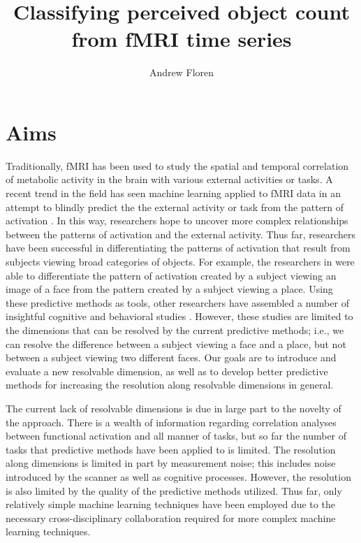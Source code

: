 \documentclass[12pt]{article}
\title{Classifying perceived object count from fMRI time series}
\author{Andrew Floren}
\date{}
\begin{document}
\maketitle{}

\section{Aims}
Traditionally, fMRI has been used to study the spatial and temporal correlation of metabolic activity in the brain with various external activities or tasks.
A recent trend in the field has seen machine learning applied to fMRI data in an attempt to blindly predict the the external activity or task from the pattern of activation \cite{Haxby2001,b,c}.
In this way, researchers hope to uncover more complex relationships between the patterns of activation and the external activity.
Thus far, researchers have been successful in differentiating the patterns of activation that result from subjects viewing broad categories of objects.
For example, the researchers in \cite{Haxby2001} were able to differentiate the pattern of activation created by a subject viewing an image of a face from the pattern created by a subject viewing a place.
Using these predictive methods as tools, other researchers have assembled a number of insightful cognitive and behavioral studies \cite{d,e,f}.
However, these studies are limited to the dimensions that can be resolved by the current predictive methods; i.e., we can resolve the difference between a subject viewing a face and a place, but not between a subject viewing two different faces.
Our goals are to introduce and evaluate a new resolvable dimension, as well as to develop better predictive methods for increasing the resolution along resolvable dimensions in general.

The current lack of resolvable dimensions is due in large part to the novelty of the approach.
There is a wealth of information regarding correlation analyses between functional activation and all manner of tasks, but so far the number of tasks that predictive methods have been applied to is limited.
The resolution along dimensions is limited in part by measurement noise; this includes noise introduced by the scanner as well as cognitive processes.
However, the resolution is also limited by the quality of the predictive methods utilized.
Thus far, only relatively simple machine learning techniques have been employed due to the necessary cross-disciplinary collaboration required for more complex machine learning techniques.
\end{document}
